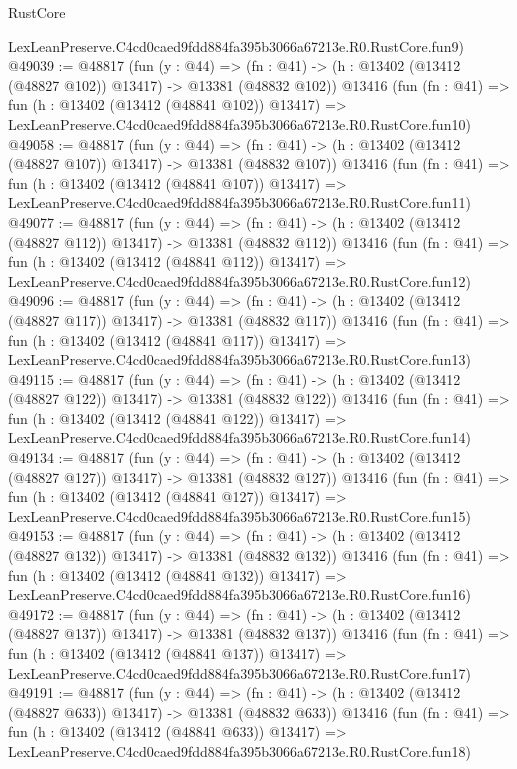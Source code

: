 \begin{lexlean}{RustCore}
\begin{coremodule}
    LexLeanPreserve.C4cd0caed9fdd884fa395b3066a67213e.R0.RustCore.fun9)
@49039 := @48817
    (fun (y : @44) =>
    (fn : @41) -> (h : @13402 (@13412 (@48827 @102)) @13417) -> @13381 (@48832 @102))
    @13416
    (fun (fn : @41) =>
    fun (h : @13402 (@13412 (@48841 @102)) @13417) =>
    LexLeanPreserve.C4cd0caed9fdd884fa395b3066a67213e.R0.RustCore.fun10)
@49058 := @48817
    (fun (y : @44) =>
    (fn : @41) -> (h : @13402 (@13412 (@48827 @107)) @13417) -> @13381 (@48832 @107))
    @13416
    (fun (fn : @41) =>
    fun (h : @13402 (@13412 (@48841 @107)) @13417) =>
    LexLeanPreserve.C4cd0caed9fdd884fa395b3066a67213e.R0.RustCore.fun11)
@49077 := @48817
    (fun (y : @44) =>
    (fn : @41) -> (h : @13402 (@13412 (@48827 @112)) @13417) -> @13381 (@48832 @112))
    @13416
    (fun (fn : @41) =>
    fun (h : @13402 (@13412 (@48841 @112)) @13417) =>
    LexLeanPreserve.C4cd0caed9fdd884fa395b3066a67213e.R0.RustCore.fun12)
@49096 := @48817
    (fun (y : @44) =>
    (fn : @41) -> (h : @13402 (@13412 (@48827 @117)) @13417) -> @13381 (@48832 @117))
    @13416
    (fun (fn : @41) =>
    fun (h : @13402 (@13412 (@48841 @117)) @13417) =>
    LexLeanPreserve.C4cd0caed9fdd884fa395b3066a67213e.R0.RustCore.fun13)
@49115 := @48817
    (fun (y : @44) =>
    (fn : @41) -> (h : @13402 (@13412 (@48827 @122)) @13417) -> @13381 (@48832 @122))
    @13416
    (fun (fn : @41) =>
    fun (h : @13402 (@13412 (@48841 @122)) @13417) =>
    LexLeanPreserve.C4cd0caed9fdd884fa395b3066a67213e.R0.RustCore.fun14)
@49134 := @48817
    (fun (y : @44) =>
    (fn : @41) -> (h : @13402 (@13412 (@48827 @127)) @13417) -> @13381 (@48832 @127))
    @13416
    (fun (fn : @41) =>
    fun (h : @13402 (@13412 (@48841 @127)) @13417) =>
    LexLeanPreserve.C4cd0caed9fdd884fa395b3066a67213e.R0.RustCore.fun15)
@49153 := @48817
    (fun (y : @44) =>
    (fn : @41) -> (h : @13402 (@13412 (@48827 @132)) @13417) -> @13381 (@48832 @132))
    @13416
    (fun (fn : @41) =>
    fun (h : @13402 (@13412 (@48841 @132)) @13417) =>
    LexLeanPreserve.C4cd0caed9fdd884fa395b3066a67213e.R0.RustCore.fun16)
@49172 := @48817
    (fun (y : @44) =>
    (fn : @41) -> (h : @13402 (@13412 (@48827 @137)) @13417) -> @13381 (@48832 @137))
    @13416
    (fun (fn : @41) =>
    fun (h : @13402 (@13412 (@48841 @137)) @13417) =>
    LexLeanPreserve.C4cd0caed9fdd884fa395b3066a67213e.R0.RustCore.fun17)
@49191 := @48817
    (fun (y : @44) =>
    (fn : @41) -> (h : @13402 (@13412 (@48827 @633)) @13417) -> @13381 (@48832 @633))
    @13416
    (fun (fn : @41) =>
    fun (h : @13402 (@13412 (@48841 @633)) @13417) =>
    LexLeanPreserve.C4cd0caed9fdd884fa395b3066a67213e.R0.RustCore.fun18)

\end{coremodule}
\end{lexlean}
